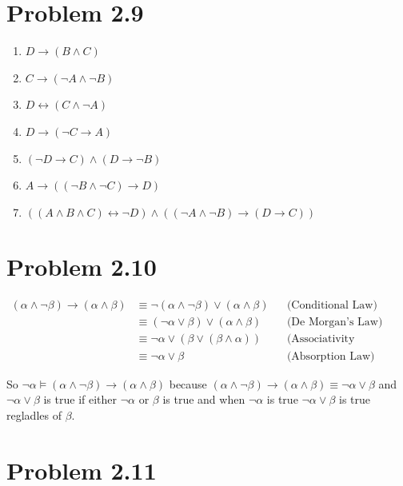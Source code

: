 \documentclass[12pt]{article}
\begin{document}
\section*{Problem 2.9}
\begin{enumerate}
    \renewcommand{\labelenumi}{\alph{enumi})}
    \item $D \rightarrow (B \land C)$
    \item $C \rightarrow (\neg A \land \neg B)$
    \item $D \leftrightarrow (C \land \neg A)$
    \item $D \rightarrow (\neg C \rightarrow A)$
    \item $(\neg D \rightarrow C) \land (D \rightarrow \neg B)$
    \item $A \rightarrow ((\neg B \land \neg C) \rightarrow D)$
    \item $((A \land B \land C) \leftrightarrow \neg D) \land ((\neg A \land \neg B) \rightarrow (D \rightarrow C))$
\end{enumerate}

\section*{Problem 2.10}
\begin{align*}
(\alpha \land \neg\beta) \to (\alpha \land \beta) &\equiv \neg(\alpha \land \neg\beta) \lor (\alpha \land \beta) && \text{(Conditional Law)} \\
&\equiv (\neg\alpha \lor \beta) \lor (\alpha \land \beta) && \text{(De Morgan's Law)} \\
&\equiv \neg\alpha \lor (\beta \lor (\beta \land \alpha)) && \text{(Associativity \& Commutativity)} \\
&\equiv \neg\alpha \lor \beta && \text{(Absorption Law)}
\end{align*}

So $\neg \alpha\models (\alpha \land \neg\beta) \to (\alpha \land \beta)$ because $(\alpha \land \neg\beta) \to (\alpha \land \beta) \equiv \neg \alpha \lor\beta$ and $\neg\alpha \lor \beta$ is true if either $\neg\alpha$ or $\beta$ is true and when $\neg \alpha$ is true  $\neg\alpha \lor \beta$ is true regladles of $\beta$.
\\
\section*{Problem 2.11}
\end{document}
